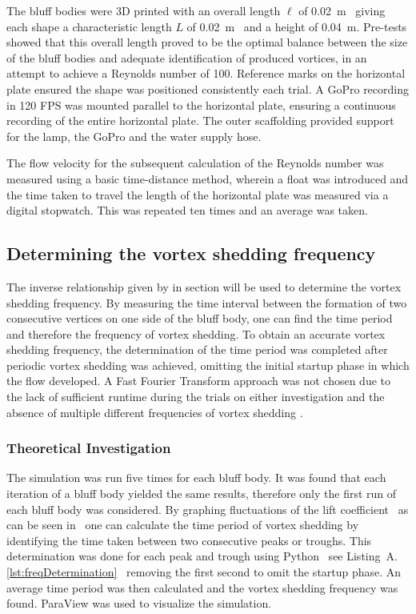 The bluff bodies were 3D printed with an overall length $\ell$ of \SI{0.02}{\meter} \textemdash\ giving each shape a characteristic length $L$ of \SI{0.02}{\meter} \textemdash\ and a height of \SI{0.04}{\meter}. Pre-tests showed that this overall length proved to be the optimal balance between the size of the bluff bodies and adequate identification of produced vortices, in an attempt to achieve a Reynolds number of \num{100}. Reference marks on the horizontal plate ensured the shape was positioned consistently each trial. A GoPro recording in 120 FPS was mounted parallel to the horizontal plate, ensuring a continuous recording of the entire horizontal plate. The outer scaffolding provided support for the lamp, the GoPro and the water supply hose. 

The flow velocity for the subsequent calculation of the Reynolds number was measured using a basic time-distance method, wherein a float was introduced and the time taken to travel the length of the horizontal plate was measured via a digital stopwatch. This was repeated ten times and an average was taken.

\subsection{Determining the vortex shedding frequency}
The inverse relationship given by  in section  will be used to determine the vortex shedding frequency. By measuring the time interval between the formation of two consecutive vertices on one side of the bluff body, one can find the time period and therefore the frequency of vortex shedding. To obtain an accurate vortex shedding frequency, the determination of the time period was completed after periodic vortex shedding was achieved, omitting the initial startup phase in which the flow developed. A Fast Fourier Transform approach was not chosen due to the lack of sufficient runtime during the trials on either investigation and the absence of multiple different frequencies of vortex shedding \parencites[10--11]{shi2025vortex}[12]{xu_experimental_2025}.

\subsubsection{Theoretical Investigation}
\label{sec:theoreticalMethod}
The simulation was run five times for each bluff body. It was found that each iteration of a bluff body yielded the same results, therefore only the first run of each bluff body was considered. By graphing fluctuations of the lift coefficient \textemdash\ as can be seen in  \textemdash\ one can calculate the time period of vortex shedding by identifying the time taken between two consecutive peaks or troughs. This determination was done for each peak and trough using Python \textemdash\ see Listing~A.\ref{lst:freqDetermination} \textemdash\ removing the first second to omit the startup phase. An average time period was then calculated and the vortex shedding frequency was found. ParaView was used to visualize the simulation.

